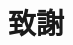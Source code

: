 \chapter*{致謝}
\renewcommand{\baselinestretch}{10} %
\par
\renewcommand{\baselinestretch}{1} %
\twelve
\par